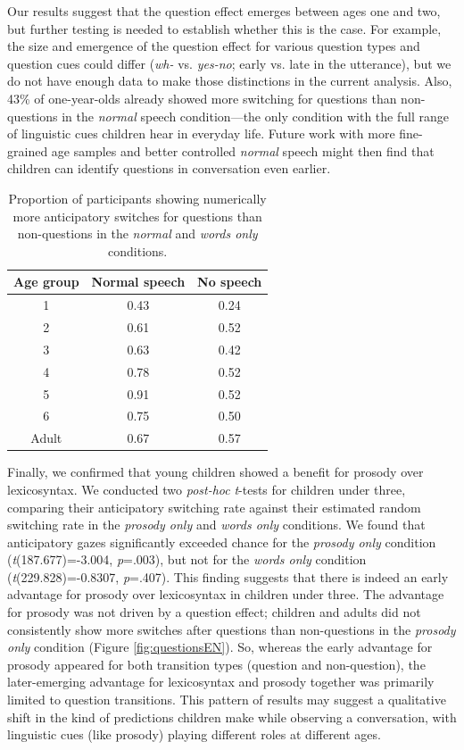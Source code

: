 \documentclass[authoryear, 12pt]{elsarticle}
\begin{document}
Our results suggest that the question effect emerges between ages one and two, but further testing is needed to establish whether this is the case. For example, the size and emergence of the question effect for various question types and question cues could differ (\textit{wh-} vs. \textit{yes-no}; early vs. late in the utterance), but we do not have enough data to make those distinctions in the current analysis. Also, 43\% of one-year-olds already showed more switching for questions than non-questions in the \textit{normal} speech condition---the only condition with the full range of linguistic cues children hear in everyday life. Future work with more fine-grained age samples and better controlled \textit{normal} speech might then find that children can identify questions in conversation even earlier.

\begin{table}[t]
\begin{center}
  \begin{tabular}{ccc}
    \hline
    Age group & Normal speech & No speech \\ 
    \hline
    1 & 0.43 & 0.24 \\
    2 & 0.61 & 0.52 \\
    3 & 0.63 & 0.42 \\
    4 & 0.78 & 0.52 \\
    5 & 0.91 & 0.52 \\
    6 & 0.75 & 0.50 \\
    Adult & 0.67 & 0.57 \\
    \hline
  \end{tabular}
\end{center}
  \caption{Proportion of participants showing numerically more anticipatory switches for questions than non-questions in the \textit{normal} and \textit{words only} conditions.}
\label{tab:questioneffectexp2}
\end{table}

Finally, we confirmed that young children showed a benefit for prosody over lexicosyntax. We conducted two \textit{post-hoc} \textit{t}-tests for children under three, comparing their anticipatory switching rate against their estimated random switching rate in the \textit{prosody only} and \textit{words only} conditions. We found that anticipatory gazes significantly exceeded chance for the \textit{prosody only} condition (\textit{t}(187.677)=-3.004, \textit{p}=.003), but not for the \textit{words only} condition (\textit{t}(229.828)=-0.8307, \textit{p}=.407). This finding suggests that there is indeed an early advantage for prosody over lexicosyntax in children under three. The advantage for prosody was not driven by a question effect; children and adults did not consistently show more switches after questions than non-questions in the \textit{prosody only} condition (Figure \ref{fig:questionsEN}). So, whereas the early advantage for prosody appeared for both transition types (question and non-question), the later-emerging advantage for lexicosyntax and prosody together was primarily limited to question transitions. This pattern of results may suggest a qualitative shift in the kind of predictions children make while observing a conversation, with linguistic cues (like prosody) playing different roles at different ages.
\end{document}
